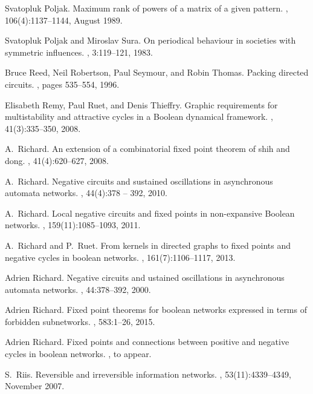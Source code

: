 \documentclass[a4paper, 11pt]{book}
\numberwithin{equation}{section}
\theoremstyle{plain}
\renewcommand{\(}{\ldbrack}
\renewcommand{\)}{\rdbrack}
\begin{document}
\begin{thebibliography}{100}
Svatopluk Poljak.
\newblock Maximum rank of powers of a matrix of a given pattern.
,
  106(4):1137--1144, August 1989.

Svatopluk Poljak and Miroslav Sura.
\newblock On periodical behaviour in societies with symmetric influences.
, 3:119--121, 1983.

Bruce Reed, Neil Robertson, Paul Seymour, and Robin Thomas.
\newblock Packing directed circuits.
, pages 535--554, 1996.

Elisabeth Remy, Paul Ruet, and Denis Thieffry.
\newblock Graphic requirements for multistability and attractive cycles in a
  {B}oolean dynamical framework.
, 41(3):335--350, 2008.

A.~Richard.
\newblock An extension of a combinatorial fixed point theorem of shih and dong.
, 41(4):620--627, 2008.

A.~Richard.
\newblock Negative circuits and sustained oscillations in asynchronous automata
  networks.
, 44(4):378 -- 392, 2010.

A.~Richard.
\newblock Local negative circuits and fixed points in non-expansive {B}oolean
  networks.
, 159(11):1085--1093, 2011.

A.~Richard and P.~Ruet.
\newblock From kernels in directed graphs to fixed points and negative cycles
  in boolean networks.
, 161(7):1106--1117, 2013.

Adrien Richard.
\newblock Negative circuits and ustained oscillations in asynchronous automata
  networks.
, 44:378--392, 2000.

Adrien Richard.
\newblock Fixed point theorems for boolean networks expressed in terms of
  forbidden subnetworks.
, 583:1--26, 2015.

Adrien Richard.
\newblock Fixed points and connections between positive and negative cycles in
  boolean networks.
, to appear.

S.~Riis.
\newblock Reversible and irreversible information networks.
, 53(11):4339--4349,
  November 2007.


\end{thebibliography}
\end{document}
